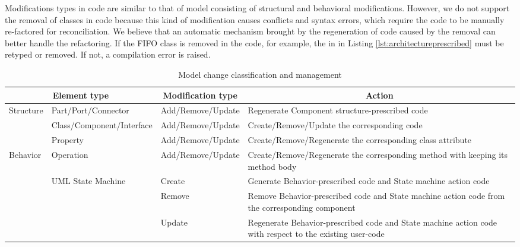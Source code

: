 \vskip 0.2cm
\noindent
{}
Modifications types in code are similar to that of model consisting of structural and behavioral modifications.
However, we do not support the removal of classes in code because this kind of modification causes conflicts and syntax errors, which require the code to be manually re-factored for reconciliation. 
We believe that an automatic mechanism brought by the regeneration of code caused by the removal can better handle the refactoring.
If the FIFO class is removed in the code, for example, the  in  in Listing \ref{lst:architectureprescribed} must be retyped or removed.
If not, a compilation error is raised.

\begin{table*}[]
	\centering
	\caption{Model change classification and management}
	\label{table:modelchangeclassification}
	\begin{tabular}{|l|p{3cm}|l|p{9.5cm}|}
		\hline
		\multicolumn{2}{|c|}{Element type}                              & \multicolumn{1}{c|}{Modification type} & \multicolumn{1}{c|}{Action}                                                                              \\ \hline
		\multirow{3}{*}{Structure} & Part/Port/Connector                & Add/Remove/Update                      & Regenerate Component structure-prescribed code                                                           \\ \cline{2-4} 
		& Class/Component/Interface          & Add/Remove/Update                      & Create/Remove/Update the corresponding code                                                              \\ \cline{2-4} 
		& Property                           & Add/Remove/Update                      & Create/Remove/Regenerate the corresponding class attribute                                               \\ \hline
		\multirow{4}{*}{Behavior}  & Operation                          & Add/Remove/Update                      & Create/Remove/Regenerate the corresponding method with keeping its method body                           \\ \cline{2-4} 
		& \multirow{3}{*}{UML State Machine} & Create                                 & Generate Behavior-prescribed code and State machine action code                                          \\ \cline{3-4} 
		&                                    & Remove                                 & Remove Behavior-prescribed code and State machine action code from the corresponding component           \\ \cline{3-4} 
		&                                    & Update                                 & Regenerate Behavior-prescribed code and State machine action code with respect to the existing user-code \\
		\hline
	\end{tabular}
\end{table*}

